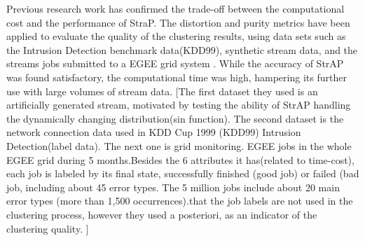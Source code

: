 Previous research work has confirmed the trade-off between the computational cost and the performance of StraP. The distortion and purity metrics have been applied to evaluate the quality of the clustering results, using data sets such as the Intrusion Detection benchmark data(KDD99), synthetic stream data, and the streams jobs submitted to a EGEE grid system \cite{zhang2008data}. While the accuracy of StrAP was found satisfactory, the computational time was high, hampering its further use with large volumes of stream data.  
[The first dataset they used is an artificially generated stream, motivated by testing the ability of StrAP handling the dynamically changing distribution(sin function).
The second dataset is the network connection data used in KDD Cup 1999 (KDD99) Intrusion Detection(label data).
The next one is grid monitoring. EGEE jobs in the whole EGEE grid during 5 months.Besides the 6 attributes it has(related to time-cost), each job is labeled by its final state, successfully finished (good job) or failed (bad job, including about 45 error types. The 5 million jobs include about 20 main error types (more than 1,500 occurrences).that the job labels are not used in the clustering process, however they used a posteriori, as an indicator of the clustering quality.
]






